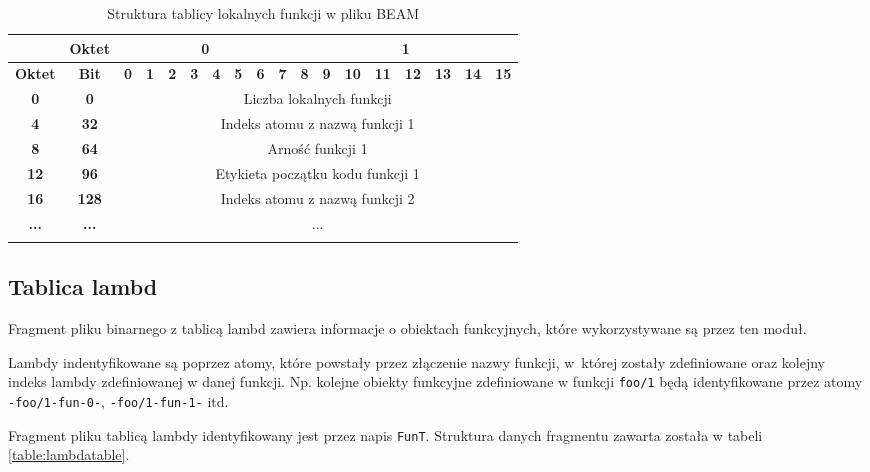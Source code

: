 \begin{longtable}{|c|c|c|c|c|c|c|c|c|c|c|c|c|c|c|c|c|c|}
\hline
         & \textbf{Oktet} & \multicolumn{8}{|c|}{\textbf{0}} & \multicolumn{8}{|c|}{\textbf{1}} \\
\hline
\textbf{Oktet} & \textbf{Bit} & \textbf{0} & \textbf{1} & \textbf{2} & \textbf{3} & \textbf{4} & \textbf{5} & \textbf{6} & \textbf{7} & \textbf{8} & \textbf{9} & \textbf{10} & \textbf{11} & \textbf{12} & \textbf{13} & \textbf{14} & \textbf{15}\\
\hline
\textbf{0} & \textbf{0} & \multicolumn{16}{|c|}{Liczba lokalnych funkcji} \\[3ex]
\hline
\textbf{4} & \textbf{32} & \multicolumn{16}{|c|}{Indeks atomu z nazwą funkcji 1}\\[3ex]
\hline
\textbf{8} & \textbf{64} & \multicolumn{16}{|c|}{Arność funkcji 1} \\[3ex]
\hline
\textbf{12} & \textbf{96} & \multicolumn{16}{|c|}{Etykieta początku kodu funkcji 1}\\[3ex]
\hline
\textbf{16} & \textbf{128} & \multicolumn{16}{|c|}{Indeks atomu z nazwą funkcji 2}\\[3ex]
\hline
\textbf{...} & \textbf{...} & \multicolumn{16}{|c|}{...}  \\[3ex]
\hline
\caption{Struktura tablicy lokalnych funkcji w pliku BEAM}
\label{table:localtable} \\
\end{longtable}

\subsection{Tablica lambd}
Fragment pliku binarnego z tablicą lambd zawiera informacje o obiektach funkcyjnych, które wykorzystywane są przez ten moduł.

Lambdy indentyfikowane są poprzez atomy, które powstały przez złączenie nazwy funkcji, w~której zostały zdefiniowane oraz kolejny indeks lambdy zdefiniowanej w danej funkcji.
Np. kolejne obiekty funkcyjne zdefiniowane w funkcji \texttt{foo/1} będą identyfikowane przez atomy \texttt{-foo/1-fun-0-}, \texttt{-foo/1-fun-1-} itd.

Fragment pliku tablicą lambdy identyfikowany jest przez napis \texttt{FunT}. Struktura danych fragmentu zawarta została w tabeli \ref{table:lambdatable}.

